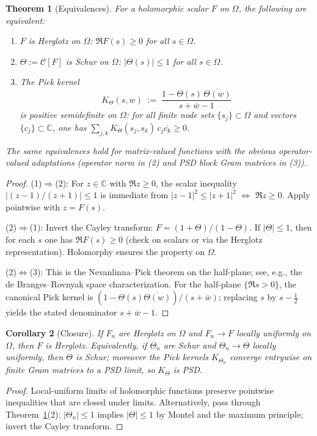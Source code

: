 \documentclass[11pt]{article}
\newtheorem{theorem}{Theorem}
\newtheorem{corollary}[theorem]{Corollary}
\theoremstyle{remark}
\newcommand{\C}{\mathbb{C}}
\begin{document}
\begin{theorem}[Equivalences]\label{thm:equivalences}
For a holomorphic scalar \(F\) on \(\Omega\), the following are equivalent:
\begin{enumerate}
 \item \(F\) is Herglotz on \(\Omega\): \(\Re F(s)\ge 0\) for all \(s\in\Omega\).
 \item \(\Theta:=\mathcal C[F]\) is Schur on \(\Omega\): \(|\Theta(s)|\le 1\) for all \(s\in\Omega\).
 \item The Pick kernel
 \[
  K_\Theta(s,w)\;:=\;\frac{1-\Theta(s)\,\overline{\Theta(w)}}{s+\overline{w}-1}
 \]
 is positive semidefinite on \(\Omega\): for all finite node sets \(\{s_j\}\subset\Omega\) and vectors \(\{c_j\}\subset\C\), one has \(\sum_{j,k} K_\Theta(s_j,s_k)\,c_j\overline{c_k}\ge 0\).
\end{enumerate}
The same equivalences hold for matrix-valued functions with the obvious operator-valued adaptations (operator norm in (2) and PSD block Gram matrices in (3)).
\end{theorem}
\begin{proof}
(1)\(\Rightarrow\)(2): For \(z\in\C\) with \(\Re z\ge 0\), the scalar inequality \(|(z-1)/(z+1)|\le 1\) is immediate from \(|z-1|^2\le |z+1|^2\) \(\Leftrightarrow\) \(\Re z\ge 0\). Apply pointwise with \(z=F(s)\).

(2)\(\Rightarrow\)(1): Invert the Cayley transform: \(F=(1+\Theta)/(1-\Theta)\). If \(|\Theta|\le 1\), then for each \(s\) one has \(\Re F(s)\ge 0\) (check on scalars or via the Herglotz representation). Holomorphy ensures the property on \(\Omega\).

(2)\(\Leftrightarrow\)(3): This is the Nevanlinna--Pick theorem on the half-plane; see, e.g., the de Branges--Rovnyak space characterization. For the half-plane \(\{\Re s>0\}\), the canonical Pick kernel is \((1-\Theta(s)\overline{\Theta(w)})/(s+\overline{w})\); replacing \(s\) by \(s-\tfrac12\) yields the stated denominator \(s+\overline{w}-1\).
\end{proof}

\begin{corollary}[Closure]\label{cor:closure}
If \(F_n\) are Herglotz on \(\Omega\) and \(F_n\to F\) locally uniformly on \(\Omega\), then \(F\) is Herglotz. Equivalently, if \(\Theta_n\) are Schur and \(\Theta_n\to\Theta\) locally uniformly, then \(\Theta\) is Schur; moreover the Pick kernels \(K_{\Theta_n}\) converge entrywise on finite Gram matrices to a PSD limit, so \(K_{\Theta}\) is PSD.
\end{corollary}
\begin{proof}
Local-uniform limits of holomorphic functions preserve pointwise inequalities that are closed under limits. Alternatively, pass through Theorem~\ref{thm:equivalences}(2): \(|\Theta_n|\le 1\) implies \(|\Theta|\le 1\) by Montel and the maximum principle; invert the Cayley transform.
\end{proof}
\end{document}
